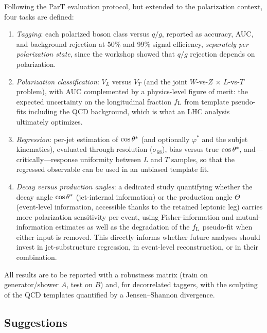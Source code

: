 Following the ParT evaluation protocol, but extended to the polarization
context, four tasks are defined:
\begin{enumerate}
\item \emph{Tagging}: each polarized boson class versus $q/g$, reported as
accuracy, AUC, and background rejection at 50\% and 99\% signal efficiency,
\emph{separately per polarization state}, since the workshop showed that
$q/g$ rejection depends on polarization.
\item \emph{Polarization classification}: $V_L$ versus $V_T$ (and the joint
$W$-vs-$Z$ $\times$ $L$-vs-$T$ problem), with AUC complemented by a
physics-level figure of merit: the expected uncertainty on the longitudinal
fraction $f_{\mathrm{L}}$ from template pseudo-fits including the QCD background, which
is what an LHC analysis ultimately optimizes.
\item \emph{Regression}: per-jet estimation of $\cos\theta^{*}$ (and optionally
$\varphi^{*}$ and the subjet kinematics), evaluated through resolution
($\sigma_{68}$), bias versus true $\cos\theta^{*}$, and---critically---response
uniformity between $L$ and $T$ samples, so that the regressed observable can
be used in an unbiased template fit.
\item \emph{Decay versus production angles}: a dedicated study quantifying
whether the decay angle $\cos\theta^{*}$ (jet-internal information) or the production
angle $\Theta$ (event-level information, accessible thanks to the retained
leptonic leg) carries more polarization sensitivity per event, using
Fisher-information and mutual-information estimates as well as the degradation
of the $f_{\mathrm{L}}$ pseudo-fit when either input is removed. This directly informs
whether future analyses should invest in jet-substructure regression, in
event-level reconstruction, or in their combination.
\end{enumerate}
All results are to be reported with a robustness matrix (train on
generator/shower $A$, test on $B$) and, for decorrelated taggers, with the
sculpting of the QCD templates quantified by a Jensen--Shannon divergence.

\subsection{Suggestions}

